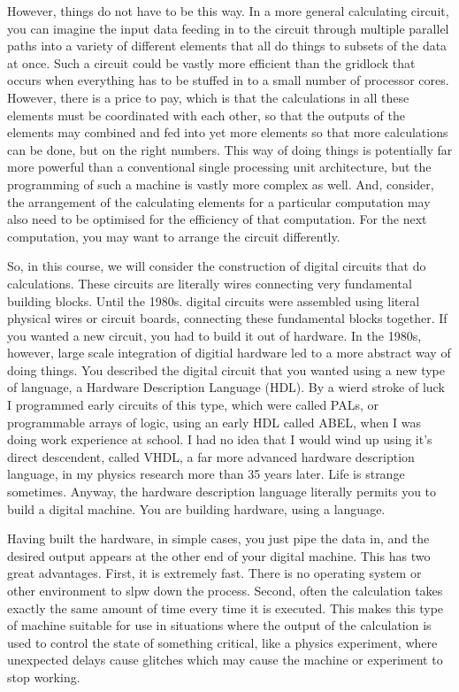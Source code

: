 \documentclass[../physical_computing.tex]{subfiles}
\begin{document}
However, things do not have to be this way. In a more general calculating circuit, you can imagine the input data feeding in to the circuit through multiple parallel paths into a variety of different elements that all do things to subsets of the data at once. Such a circuit could be vastly more efficient than the gridlock that occurs when everything has to be stuffed in to a small number of processor cores. However, there is a price to pay, which is that the calculations in all these elements must be coordinated with each other, so that the outputs of the elements may combined and fed into yet more elements so that more calculations can be done, but on the right numbers. This way of doing things is potentially far more powerful than a conventional single processing unit architecture, but the programming of such a machine is vastly more complex as well. And, consider, the arrangement of the calculating elements for a particular computation may also need to be optimised for the efficiency of that computation. For the next computation, you may want to arrange the circuit differently.

So, in this course, we will consider the construction of digital circuits that do calculations. These circuits are literally wires connecting very fundamental building blocks. Until the 1980s. digital circuits were assembled using literal physical wires or circuit boards, connecting these fundamental blocks together. If you wanted a new circuit, you had to build it out of hardware. In the 1980s, however, large scale integration of digitial hardware led to a more abstract way of doing things. You described the digital circuit that you wanted using a new type of language, a Hardware Description Language (HDL). By a wierd stroke of luck I programmed early circuits of this type, which were called PALs, or programmable arrays of logic, using an early HDL called ABEL, when I was doing work experience at school. I had no idea that I would wind up using it's direct descendent, called VHDL, a far more advanced hardware description language, in my physics research more than 35 years later. Life is strange sometimes. Anyway, the hardware description language literally permits you to build a digital machine. You are building hardware, using a language.

Having built the hardware, in simple cases, you just pipe the data in, and the desired output appears at the other end of your digital machine. This has two great advantages. First, it is extremely fast. There is no operating system or other environment to slpw down the process. Second, often the calculation takes exactly the same amount of time every time it is executed. This makes this type of machine suitable for use in situations where the output of the calculation is used to control the state of something critical, like a physics experiment, where unexpected delays cause glitches which may cause the machine or experiment to stop working.
\end{document}

